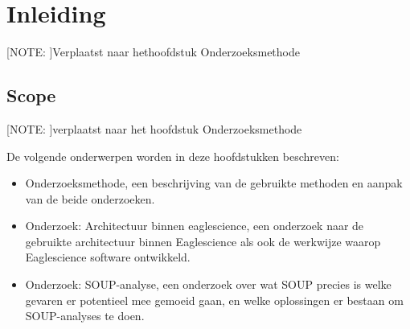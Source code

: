 
\chapter{Inleiding}\label{ch:inleiding3} %


\label{inOnderzoek} %

[NOTE: ]Verplaatst naar hethoofdstuk Onderzoeksmethode

\section{Scope}\label{sec:scope}
[NOTE: ]verplaatst naar het hoofdstuk Onderzoeksmethode

De volgende onderwerpen worden in deze hoofdstukken beschreven:
\begin{itemize}
    \item Onderzoeksmethode, een beschrijving van de gebruikte methoden en aanpak van de beide onderzoeken.
    \item Onderzoek: Architectuur binnen eaglescience, een onderzoek naar de gebruikte architectuur binnen Eaglescience als ook de werkwijze waarop Eaglescience software ontwikkeld.
    \item Onderzoek: SOUP-analyse, een onderzoek over wat SOUP precies is welke gevaren er potentieel mee gemoeid gaan, en welke oplossingen er bestaan om SOUP-analyses te doen.
\end{itemize}
